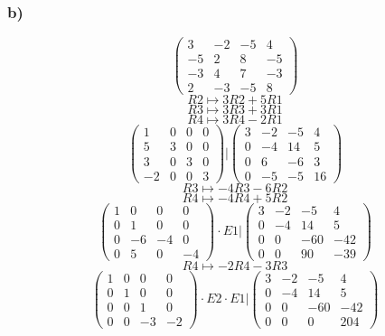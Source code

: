 \documentclass[10pt,a4paper]{article}
\begin{document}
\subsubsection*{b)}
\[
\begin{pmatrix}
3 & -2 & -5 & 4\\
-5 & 2 & 8 & -5\\
-3 & 4 & 7 & -3\\
2 & -3 & -5 & 8
\end{pmatrix}
\]
\[ R2 \longmapsto 3R2 + 5R1 \]
\[ R3 \longmapsto 3R3 + 3R1 \]
\[ R4 \longmapsto 3R4 - 2R1 \]
\[
\left.\begin{pmatrix}
1 & 0 & 0 & 0\\
5 & 3 & 0 & 0\\
3 & 0 & 3 & 0\\
-2 & 0 & 0 & 3
\end{pmatrix}
\right.\Bigg|
\begin{pmatrix}
3 & -2 & -5 & 4\\
0 & -4 & 14 & 5\\
0 & 6 & -6 & 3\\
0 & -5 & -5 & 16
\end{pmatrix}
\]
\[ R3 \longmapsto -4R3 - 6R2 \]
\[ R4 \longmapsto -4R4 + 5R2\]
\[
\left.\begin{pmatrix}
1 & 0 & 0 & 0\\
0 & 1 & 0 & 0\\
0 & -6 & -4 & 0\\
0 & 5 & 0 & -4
\end{pmatrix}
\cdot E1
\right.\Bigg|
\begin{pmatrix}
3 & -2 & -5 & 4\\
0 & -4 & 14 & 5\\
0 & 0 & -60 & -42\\
0 & 0 & 90 & -39
\end{pmatrix}
\]
\[ R4 \longmapsto -2R4 - 3R3 \]
\[
\left.\begin{pmatrix}
1 & 0 & 0 & 0\\
0 & 1 & 0 & 0\\
0 & 0 & 1 & 0\\
0 & 0 & -3 & -2
\end{pmatrix}
\cdot E2 \cdot E1
\right.\Bigg|
\begin{pmatrix}
3 & -2 & -5 & 4\\
0 & -4 & 14 & 5\\
0 & 0 & -60 & -42\\
0 & 0 & 0 & 204
\end{pmatrix}
\]
\end{document}
